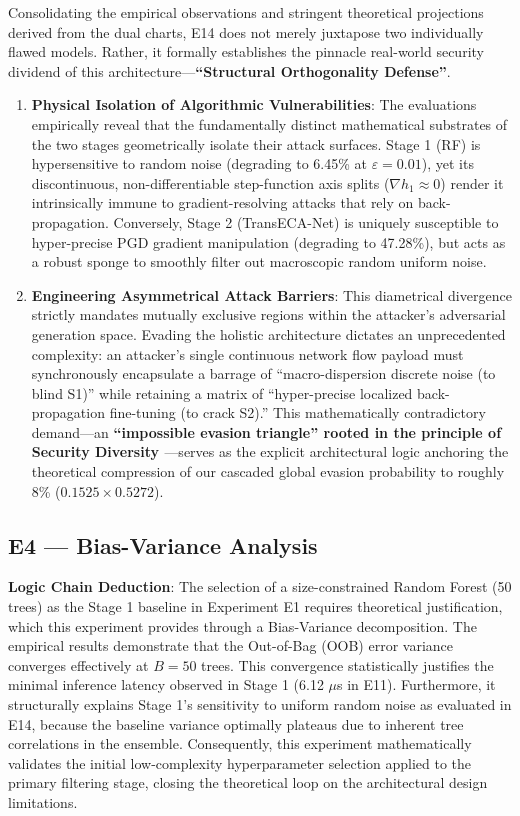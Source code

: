 \documentclass[sigconf]{acmart}
\begin{document}
Consolidating the empirical observations and stringent theoretical projections derived from the dual charts, E14 does not merely juxtapose two individually flawed models. Rather, it formally establishes the pinnacle real-world security dividend of this architecture---\textbf{``Structural Orthogonality Defense''}.
\begin{enumerate}
\item \textbf{Physical Isolation of Algorithmic Vulnerabilities}: The evaluations empirically reveal that the fundamentally distinct mathematical substrates of the two stages geometrically isolate their attack surfaces. Stage 1 (RF) is hypersensitive to random noise (degrading to 6.45\% at $\varepsilon=0.01$), yet its discontinuous, non-differentiable step-function axis splits ($\nabla h_1 \approx 0$) render it intrinsically immune to gradient-resolving attacks that rely on back-propagation. Conversely, Stage 2 (TransECA-Net) is uniquely susceptible to hyper-precise PGD gradient manipulation (degrading to 47.28\%), but acts as a robust sponge to smoothly filter out macroscopic random uniform noise.
\item \textbf{Engineering Asymmetrical Attack Barriers}: This diametrical divergence strictly mandates mutually exclusive regions within the attacker's adversarial generation space. Evading the holistic architecture dictates an unprecedented complexity: an attacker's single continuous network flow payload must synchronously encapsulate a barrage of ``macro-dispersion discrete noise (to blind S1)'' while retaining a matrix of ``hyper-precise localized back-propagation fine-tuning (to crack S2).'' This mathematically contradictory demand---an \textbf{``impossible evasion triangle'' rooted in the principle of Security Diversity \cite{22}}---serves as the explicit architectural logic anchoring the theoretical compression of our cascaded global evasion probability to roughly 8\% ($0.1525 \times 0.5272$).
\end{enumerate}

\subsection{E4 --- Bias-Variance Analysis}
\textbf{Logic Chain Deduction}: The selection of a size-constrained Random Forest (50 trees) as the Stage 1 baseline in Experiment E1 requires theoretical justification, which this experiment provides through a Bias-Variance decomposition. The empirical results demonstrate that the Out-of-Bag (OOB) error variance converges effectively at $B=50$ trees. This convergence statistically justifies the minimal inference latency observed in Stage 1 (6.12 $\mu$s in E11). Furthermore, it structurally explains Stage 1's sensitivity to uniform random noise as evaluated in E14, because the baseline variance optimally plateaus due to inherent tree correlations in the ensemble. Consequently, this experiment mathematically validates the initial low-complexity hyperparameter selection applied to the primary filtering stage, closing the theoretical loop on the architectural design limitations.
\end{document}
